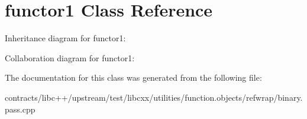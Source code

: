 \hypertarget{classfunctor1}{}\section{functor1 Class Reference}
\label{classfunctor1}


Inheritance diagram for functor1\+:


Collaboration diagram for functor1\+:


The documentation for this class was generated from the following file\+:\begin{DoxyCompactItemize}
\item 
contracts/libc++/upstream/test/libcxx/utilities/function.\+objects/refwrap/binary.\+pass.\+cpp\end{DoxyCompactItemize}
